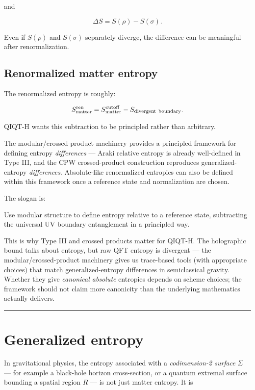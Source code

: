 \documentclass[11pt,a4paper]{article}
\newenvironment{qiqtquote}{\begin{mdframed}[style=quotestyle]}{\end{mdframed}}
\begin{document}
and

\[
\Delta S=S(\rho)-S(\sigma).
\]

Even if $S(\rho)$ and $S(\sigma)$ separately diverge, the difference can be meaningful after renormalization.

\subsection{Renormalized matter entropy}

The renormalized entropy is roughly:

\[
S_{\rm matter}^{\rm ren}
=
S_{\rm matter}^{\rm cutoff}
-
S_{\rm divergent\ boundary}.
\]

QIQT-H wants this subtraction to be principled rather than arbitrary.

The modular/crossed-product machinery provides a principled framework for defining entropy \emph{differences} — Araki relative entropy is already well-defined in Type III, and the CPW crossed-product construction reproduces generalized-entropy \emph{differences}. Absolute-like renormalized entropies can also be defined within this framework once a reference state and normalization are chosen.

The slogan is:

\begin{qiqtquote}
Use modular structure to define entropy relative to a reference state, subtracting the universal UV boundary entanglement in a principled way.
\end{qiqtquote}

This is why Type III and crossed products matter for QIQT-H. The holographic bound talks about entropy, but raw QFT entropy is divergent — the modular/crossed-product machinery gives us trace-based tools (with appropriate choices) that match generalized-entropy differences in semiclassical gravity. Whether they give \emph{canonical absolute} entropies depends on scheme choices; the framework should not claim more canonicity than the underlying mathematics actually delivers.

\medskip\hrule\medskip

\section{Generalized entropy}

In gravitational physics, the entropy associated with a \emph{codimension-2 surface} $\Sigma$ — for example a black-hole horizon cross-section, or a quantum extremal surface bounding a spatial region $R$ — is not just matter entropy. It is
\end{document}
